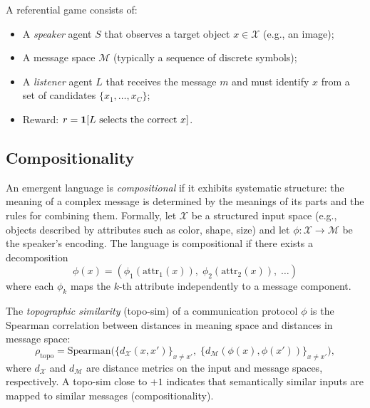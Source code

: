 \documentclass[11pt,a4paper]{article}
\begin{document}
\begin{definition}
\label{def:referential-game}
A referential game consists of:
\begin{itemize}[nosep]
  \item A \emph{speaker} agent $S$ that observes a target object
    $x \in \mathcal{X}$ (e.g., an image);
  \item A message space $\mathcal{M}$ (typically a sequence of
    discrete symbols);
  \item A \emph{listener} agent $L$ that receives the message
    $m$ and must identify $x$ from a set of candidates
    $\{x_1, \ldots, x_C\}$;
  \item Reward: $r = \mathbf{1}[L \text{ selects the correct
    } x]$.
\end{itemize}
\end{definition}

\subsection{Compositionality}

\begin{definition}[Compositionality]
\label{def:compositionality}
An emergent language is \emph{compositional} if it exhibits
systematic structure: the meaning of a complex message is
determined by the meanings of its parts and the rules for
combining them.  Formally, let $\mathcal{X}$ be a structured
input space (e.g., objects described by attributes such as
color, shape, size) and let $\phi : \mathcal{X} \to
\mathcal{M}$ be the speaker's encoding.  The language is
compositional if there exists a decomposition
\[
  \phi(x) = (\phi_1(\text{attr}_1(x)), \;\phi_2(\text{attr}_2(x)),
  \;\ldots)
\]
where each $\phi_k$ maps the $k$-th attribute independently
to a message component.
\end{definition}

\begin{definition}
\label{def:topo-sim}
The \emph{topographic similarity} (topo-sim) of a communication
protocol $\phi$ is the Spearman correlation between distances
in meaning space and distances in message space:
\[
  \rho_{\mathrm{topo}} = \mathrm{Spearman}\!\bigl(\{d_{\mathcal{X}}
  (x, x')\}_{x \neq x'}, \;\{d_{\mathcal{M}}(\phi(x),
  \phi(x'))\}_{x \neq x'}\bigr),
\]
where $d_{\mathcal{X}}$ and $d_{\mathcal{M}}$ are distance
metrics on the input and message spaces, respectively.  A
topo-sim close to $+1$ indicates that semantically similar
inputs are mapped to similar messages (compositionality).
\end{definition}
\end{document}
